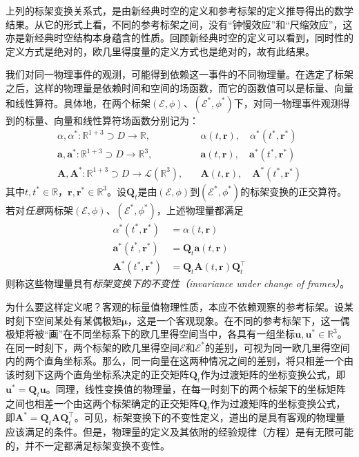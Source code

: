 \documentclass[main.tex]{subfiles}
\begin{document}
上列的标架变换关系式，是由新经典时空的定义和参考标架的定义推导得出的数学结果。从它的形式上看，不同的参考标架之间，没有“钟慢效应”和“尺缩效应”，这亦是新经典时空结构本身蕴含的性质。回顾新经典时空的定义可以看到，同时性的定义方式是绝对的，欧几里得度量的定义方式也是绝对的，故有此结果。

我们对同一物理事件的观测，可能得到依赖这一事件的不同物理量。在选定了标架之后，这样的物理量是依赖时间和空间的场函数，而它的函数值可以是标量、向量和线性算符。具体地，在两个标架$\left(\mathcal{E},\phi\right)$、$\left(\mathcal{E}^*,\phi^*\right)$下，对同一物理事件观测得到的标量、向量和线性算符场函数分别记为：
\begin{align*}
    \alpha,\alpha^*:\mathbb{R}^{1+3}\supset D\rightarrow\mathbb{R},\quad                                   & \alpha\left(t,\mathbf{r}\right),\quad      \alpha^*\left(t^*,\mathbf{r}^*\right)     \\
    \mathbf{a},\mathbf{a}^*:\mathbb{R}^{1+3}\supset D\rightarrow\mathbb{R}^3,\quad                         & \mathbf{a}\left(t,\mathbf{r}\right),\quad  \mathbf{a}^*\left(t^*,\mathbf{r}^*\right) \\
    \mathbf{A},\mathbf{A}^*:\mathbb{R}^{1+3}\supset D\rightarrow\mathcal{L}\left(\mathbb{R}^3\right),\quad & \mathbf{A}\left(t,\mathbf{r}\right),\quad  \mathbf{A}^*\left(t^*,\mathbf{r}^*\right)
\end{align*}
其中$t,t^*\in\mathbb{R}$，$\mathbf{r},\mathbf{r}^*\in\mathbb{R}^3$。设$\mathbf{Q}_t$是由$\left(\mathcal{E},\phi\right)$到$\left(\mathcal{E}^*,\phi^*\right)$的标架变换的正交算符。若对\emph{任意}两标架$\left(\mathcal{E},\phi\right)$、$\left(\mathcal{E}^*,\phi^*\right)$，上述物理量都满足
\begin{align*}
    \alpha^*\left(t^*,\mathbf{r}^*\right)     & =\alpha\left(t,\mathbf{r}\right)                                       \\
    \mathbf{a}^*\left(t^*,\mathbf{r}^*\right) & =\mathbf{Q}_t\mathbf{a}\left(t,\mathbf{r}\right)                       \\
    \mathbf{A}^*\left(t^*,\mathbf{r}^*\right) & =\mathbf{Q}_t\mathbf{A}\left(t,\mathbf{r}\right)\mathbf{Q}_t^\intercal
\end{align*}
则称这些物理量具有\emph{标架变换下的不变性（invariance under change of frames）}。

为什么要这样定义呢？客观的标量值物理性质，本应不依赖观察的参考标架。设某时刻下空间某处有某偶极矩$\boldsymbol{\mu}$，这是一个客观现象。在不同的参考标架下，这一偶极矩将被“画”在不同坐标系下的欧几里得空间当中，各具有一组坐标$\mathbf{u},\mathbf{u}^*\in\mathbb{R}^3$。在同一时刻下，两个标架的欧几里得空间$\mathcal{E}$和$\mathcal{E}^*$的差别，可视为同一欧几里得空间内的两个直角坐标系。那么，同一向量在这两种情况之间的差别，将只相差一个由该时刻下这两个直角坐标系决定的正交矩阵$\mathbf{Q}_t$作为过渡矩阵的坐标变换公式，即$\mathbf{u}^*=\mathbf{Q}_t\mathbf{u}$。同理，线性变换值的物理量，在每一时刻下的两个标架下的坐标矩阵之间也相差一个由这两个标架确定的正交矩阵$\mathbf{Q}_t$作为过渡矩阵的坐标变换公式，即$\mathbf{A}^*=\mathbf{Q}_t\mathbf{A}\mathbf{Q}_t^\intercal$。可见，标架变换下的不变性定义，道出的是具有客观的物理量应该满足的条件。但是，物理量的定义及其依附的经验规律（方程）是有无限可能的，并不一定都满足标架变换不变性。
\end{document}
